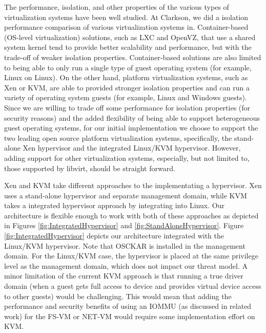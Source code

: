 The performance, isolation, and other properties of the various types of virtualization systems have been well studied. At Clarkson, we did a isolation performance comparison of various virtualization systems in\cite{isolation_paper_2007}. Container-based (OS-level virtualization) solutions, such as LXC and OpenVZ, that use a shared system kernel tend to provide better scalability and performance, but with the trade-off of weaker isolation properties. Container-based solutions are also limited to being able to only run a single type of guest operating system (for example, Linux on Linux).  On the other hand, platform virtualization systems, such as Xen or KVM, are able to provided stronger isolation properties and can run a variety of operating system guests (for example, Linux and Windows guests). Since we are willing to trade off some performance for isolation properties (for security reasons) and the added flexibility of being able to support heterogeneous guest operating systems, for our initial implementation we choose to support the two leading open source platform virtualization systems, specifically, the stand-alone Xen hypervisor and the integrated Linux/KVM hypervisor. However, adding support for other virtualization systems, especially, but not limited to, those supported by libvirt, should be straight forward.

Xen and KVM take different approaches to the implementating a hypervisor. Xen uses a stand-alone hypervisor and separate management domain, while KVM takes a integrated hypervisor approach by integrating into Linux. Our architecture is flexible enough to work with both of these approaches as depicted in Figures \ref{fig:IntegratedHypervisor} and \ref{fig:StandAloneHypervisor}. Figure \ref{fig:IntegratedHypervisor} depicts our architecture integrated with the Linux/KVM hypervisor. Note that OSCKAR is installed in the management domain. For the Linux/KVM case, the hypervisor is placed at the same privilege level as the management domain, which does not impact our threat model. A minor limitation of the current KVM approach is that running a true driver domain (when a guest gets full access to device and provides virtual device access to other guests) would be challenging\cite{kvm_driver_domain_2009}. This would mean that adding the performance and security benefits of using an IOMMU (as discussed in related work) for the FS-VM or NET-VM would require some implementation effort on KVM.


